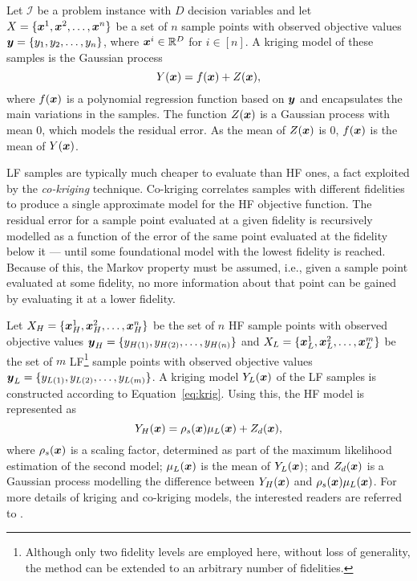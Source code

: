 Let $\mathcal{I}$ be a problem instance with $D$ decision variables and let $X = \{\boldsymbol{x}^1,\boldsymbol{x}^2,\dots,\boldsymbol{x}^n\}$ be a set of $n$ sample points with observed objective values $\boldsymbol{y} = \{y_1,y_2,\dots,y_n\}$, where $\boldsymbol{x}^i \in \mathbb{R}^D$ for $i \in [n]$. A kriging model of these samples is the Gaussian process 
\begin{equation}
Y(\boldsymbol{x}) = f(\boldsymbol{x}) + Z(\boldsymbol{x}),\label{eq:krig}
\end{equation}
where $f(\boldsymbol{x})$ is a polynomial regression function based on $\boldsymbol{y}$ and encapsulates the main variations in the samples. The function $Z(\boldsymbol{x})$ is a Gaussian process with mean $0$, which models the residual error. As the mean of $Z(\boldsymbol{x})$ is 0, $f(\boldsymbol{x})$ is the mean of $Y(\boldsymbol{x})$. 

LF samples are typically much cheaper to evaluate than HF ones, a fact exploited by the \emph{co-kriging} technique. Co-kriging correlates samples with different fidelities to produce a single approximate model for the HF objective function. The residual error for a sample point evaluated at a given fidelity is recursively modelled as a function of the error of the same point evaluated at the fidelity below it --- until some foundational model with the lowest fidelity is reached. Because of this, the Markov property must be assumed, i.e., given a sample point evaluated at some fidelity, no more information about that point can be gained by evaluating it at a lower fidelity.

Let $X_H = \{\boldsymbol{x}_H^1,\boldsymbol{x}_H^2,\dots,\boldsymbol{x}_H^n\}$ be the set of $n$ HF sample points with observed objective values $\boldsymbol{y}_H = \{y_{H(1)},y_{H(2)},\dots,y_{H(n)}\}$ and $X_L = \{\boldsymbol{x}_L^1,\boldsymbol{x}_L^2,\dots,\boldsymbol{x}_L^m\}$ be the set of $m$ LF\footnote{Although only two fidelity levels are employed here, without loss of generality, the method can be extended to an arbitrary number of fidelities.} sample points with observed objective values $\boldsymbol{y}_L = \{y_{L(1)},y_{L(2)},\dots,y_{L(m)}\}$. A kriging model $Y_L(\boldsymbol{x})$ of the LF samples is constructed according to Equation~\ref{eq:krig}. Using this, the HF model is represented as
\begin{equation}
Y_H(\boldsymbol{x}) = \rho_s(\boldsymbol{x})\mu_L(\boldsymbol{x}) + Z_d(\boldsymbol{x}),
\end{equation} 
where $\rho_s(\boldsymbol{x})$ is a scaling factor, determined as part of the maximum likelihood estimation of the second model; $\mu_L(\boldsymbol{x})$ is the mean of $Y_L(\boldsymbol{x})$; and $Z_d(\boldsymbol{x})$ is a Gaussian process modelling the difference between $Y_H(\boldsymbol{x})$ and $\rho_s(\boldsymbol{x})\mu_L(\boldsymbol{x})$. For more details of kriging and co-kriging models, the interested readers are referred to \cite{forrester2008engineering,forrester2007multi,kennedy2001bayesian,kennedy2000predicting}.

